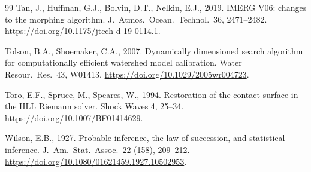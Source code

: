 \documentclass[authoryear,preprint,review,12pt]{elsarticle}
\begin{document}
\begin{thebibliography}{99}
Tan, J., Huffman, G.J., Bolvin, D.T., Nelkin, E.J., 2019. IMERG V06: changes to
the morphing algorithm. J.\ Atmos.\ Ocean.\ Technol.\ 36, 2471--2482.
\url{https://doi.org/10.1175/jtech-d-19-0114.1}.

Tolson, B.A., Shoemaker, C.A., 2007. Dynamically dimensioned search algorithm
for computationally efficient watershed model calibration. Water Resour.\ Res.\
43, W01413. \url{https://doi.org/10.1029/2005wr004723}.

Toro, E.F., Spruce, M., Speares, W., 1994. Restoration of the contact surface in
the HLL Riemann solver. Shock Waves 4, 25--34.
\url{https://doi.org/10.1007/BF01414629}.

Wilson, E.B., 1927. Probable inference, the law of succession, and statistical
inference. J.\ Am.\ Stat.\ Assoc.\ 22 (158), 209--212.
\url{https://doi.org/10.1080/01621459.1927.10502953}.

\end{thebibliography}
\end{document}
